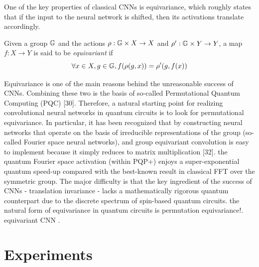 One of the key properties of classical CNNs is equivariance, which roughly states that if the input to the neural network is shifted, then its activations translate accordingly. 
\begin{definition}[Equivariance]\label{def:equivariant}
	Given a group $\mathbb{G}$ and the actions $\rho: \mathbb{G} \times X\to X$ and $\rho': \mathbb{G} \times Y\to Y$,
	a map $f: X\to Y$ is said to be \emph{equivariant} if
	\begin{equation}
		\forall x\in X, g\in \mathbb{G},
		f(\rho(g,x)) = \rho'(g,f(x))
	\end{equation}
\end{definition}
Equivariance is one of the main reasons behind the unreasonable success of CNNs.
Combining these two is the basis of so-called Permutational Quantum Computing (PQC) [30]. Therefore, a natural starting point for realizing convolutional neural networks in quantum circuits is to look for permutational equivariance.
In particular, it has been recognized that by constructing neural networks that operate on the basis of irreducible representations of the group (so-called Fourier space neural networks), and group equivariant convolution is easy to implement because it simply reduces to matrix multiplication [32].
the quantum Fourier space activation (within PQP+) enjoys a super-exponential quantum speed-up compared with the best-known result in classical FFT over the symmetric group.
The major difficulty is that the key ingredient of the success of CNNs - translation invariance - lacks a mathematically rigorous quantum counterpart due to the discrete spectrum of spin-based quantum circuits.
the natural form of equivariance in quantum circuits is permutation equivariance!.
equivariant CNN 
\cite{zhengSpeedingLearningQuantum2022}.


\section{Experiments}\label{sec:experiments}

